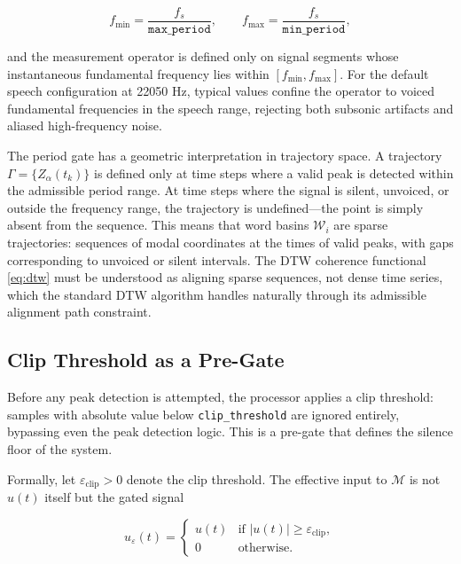 \documentclass[12pt, a4paper]{article}
\begin{document}
\begin{equation}
f_{\min} = \frac{f_s}{\texttt{max\_period}}, \qquad f_{\max} = \frac{f_s}{\texttt{min\_period}},
\label{eq:frange}
\end{equation}

and the measurement operator is defined only on signal segments whose instantaneous fundamental frequency lies within $[f_{\min}, f_{\max}]$. For the default speech configuration at 22050 Hz, typical values confine the operator to voiced fundamental frequencies in the speech range, rejecting both subsonic artifacts and aliased high-frequency noise.

The period gate has a geometric interpretation in trajectory space. A trajectory $\Gamma = \{Z_\alpha(t_k)\}$ is defined only at time steps where a valid peak is detected within the admissible period range. At time steps where the signal is silent, unvoiced, or outside the frequency range, the trajectory is undefined---the point is simply absent from the sequence. This means that word basins $\mathcal{W}_i$ are sparse trajectories: sequences of modal coordinates at the times of valid peaks, with gaps corresponding to unvoiced or silent intervals. The DTW coherence functional \eqref{eq:dtw} must be understood as aligning sparse sequences, not dense time series, which the standard DTW algorithm handles naturally through its admissible alignment path constraint.

\subsection{Clip Threshold as a Pre-Gate}

Before any peak detection is attempted, the processor applies a clip threshold: samples with absolute value below \texttt{clip\_threshold} are ignored entirely, bypassing even the peak detection logic. This is a pre-gate that defines the silence floor of the system.

Formally, let $\varepsilon_{\mathrm{clip}} > 0$ denote the clip threshold. The effective input to $\mathcal{M}$ is not $u(t)$ itself but the gated signal

\begin{equation}
u_\varepsilon(t) = \begin{cases} u(t) & \text{if } |u(t)| \geq \varepsilon_{\mathrm{clip}}, \\ 0 & \text{otherwise.} \end{cases}
\label{eq:gate}
\end{equation}
\end{document}
